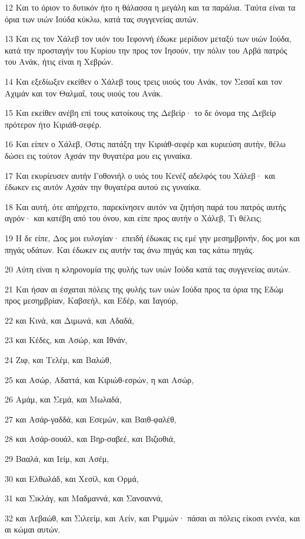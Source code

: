 \par 12 Και το όριον το δυτικόν ήτο η θάλασσα η μεγάλη και τα παράλια. Ταύτα είναι τα όρια των υιών Ιούδα κύκλω, κατά τας συγγενείας αυτών.
\par 13 Και εις τον Χάλεβ τον υιόν του Ιεφοννή έδωκε μερίδιον μεταξύ των υιών Ιούδα, κατά την προσταγήν του Κυρίου την προς τον Ιησούν, την πόλιν του Αρβά πατρός του Ανάκ, ήτις είναι η Χεβρών.
\par 14 Και εξεδίωξεν εκείθεν ο Χάλεβ τους τρεις υιούς του Ανάκ, τον Σεσαΐ και τον Αχιμάν και τον Θαλμαΐ, τους υιούς του Ανάκ.
\par 15 Και εκείθεν ανέβη επί τους κατοίκους της Δεβείρ· το δε όνομα της Δεβείρ πρότερον ήτο Κιριάθ-σεφέρ.
\par 16 Και είπεν ο Χάλεβ, Όστις πατάξη την Κιριάθ-σεφέρ και κυριεύση αυτήν, θέλω δώσει εις τούτον Αχσάν την θυγατέρα μου εις γυναίκα.
\par 17 Και εκυρίευσεν αυτήν Γοθονιήλ ο υιός του Κενέζ αδελφός του Χάλεβ· και έδωκεν εις αυτόν Αχσάν την θυγατέρα αυτού εις γυναίκα.
\par 18 Και αυτή, ότε απήρχετο, παρεκίνησεν αυτόν να ζητήση παρά του πατρός αυτής αγρόν· και κατέβη από του όνου, και είπε προς αυτήν ο Χάλεβ, Τι θέλεις;
\par 19 Η δε είπε, Δος μοι ευλογίαν· επειδή έδωκας εις εμέ γην μεσημβρινήν, δος μοι και πηγάς υδάτων. Και έδωκεν εις αυτήν τας άνω πηγάς και τας κάτω πηγάς.
\par 20 Αύτη είναι η κληρονομία της φυλής των υιών Ιούδα κατά τας συγγενείας αυτών.
\par 21 Και ήσαν αι έσχαται πόλεις της φυλής των υιών Ιούδα προς τα όρια της Εδώμ προς μεσημβρίαν, Καβσεήλ, και Εδέρ, και Ιαγούρ,
\par 22 και Κινά, και Διμωνά, και Αδαδά,
\par 23 και Κέδες, και Ασώρ, και Ιθνάν,
\par 24 Ζιφ, και Τελέμ, και Βαλώθ,
\par 25 και Ασώρ, Αδαττά, και Κιριώθ-εσρών, η και Ασώρ,
\par 26 Αμάμ, και Σεμά, και Μωλαδά,
\par 27 και Ασάρ-γαδδά, και Εσεμών, και Βαιθ-φαλέθ,
\par 28 και Ασάρ-σουάλ, και Βηρ-σαβεέ, και Βιζιοθιά,
\par 29 Βααλά, και Ιείμ, και Ασέμ,
\par 30 και Ελθωλάδ, και Χεσίλ, και Ορμά,
\par 31 και Σικλάγ, και Μαδμαννά, και Σανσαννά,
\par 32 και Λεβαώθ, και Σιλεείμ, και Αείν, και Ριμμών· πάσαι αι πόλεις είκοσι εννέα, και αι κώμαι αυτών.
